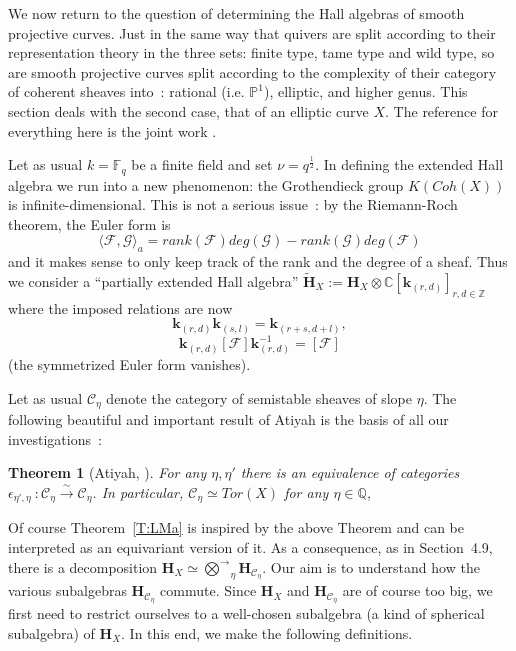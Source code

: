 \documentclass[a4paper,10pt]{amsart}
\def\Z{\mathbb{Z}}
\def\Q{\mathbb{Q}}
\def\H{\mathbf{H}}
\def\C{\mathbb{C}}
\newtheorem{theo}{\bf{Theorem}}[section]
\numberwithin{equation}{section}
\begin{document}
{\vspace{.15in}

We now return to the question of determining the Hall algebras of smooth projective curves. Just in the same way that quivers are split according to their representation theory in the three sets: finite type, tame type and wild type, so are smooth projective curves split according to the complexity of their category of coherent sheaves into~: rational (i.e. $\mathbb{P}^1$), elliptic, and higher genus. This section deals with the second case, that of an elliptic curve $X$. The reference for everything here is the joint work \cite{BS}.

\vspace{.15in}

Let as usual $k=\mathbb{F}_q$ be a finite field and set $\nu=q^{\frac{1}{2}}$. In defining the extended Hall algebra we run into a new phenomenon: the Grothendieck group $K(Coh(X))$ is infinite-dimensional. This is not a serious issue~: by the Riemann-Roch theorem, the Euler form is
$$\langle \mathcal{F},\mathcal{G}\rangle_a=rank(\mathcal{F}) deg(\mathcal{G})-rank(\mathcal{G})deg(\mathcal{F})$$
and it makes sense to only keep track of the rank and the degree of a sheaf.
Thus we consider a ``partially extended Hall algebra'' $\widetilde{\H}_X:=\H_X \otimes
\C[\mathbf{k}_{(r,d)}]_{r,d \in \Z}$ where the imposed relations are now
$$\mathbf{k}_{(r,d)} \mathbf{k}_{(s,l)}=\mathbf{k}_{(r+s,d+l)},$$
$$\mathbf{k}_{(r,d)} [\mathcal{F}] \mathbf{k}^{-1}_{(r,d)}=[\mathcal{F}]$$
(the symmetrized Euler form vanishes).

\vspace{.15in}

Let as usual $\mathcal{C}_{\eta}$ denote the category of semistable sheaves of slope $\eta$. The following beautiful and important result of Atiyah is the basis of all our investigations~:

\vspace{.1in}

\begin{theo}[Atiyah, \cite{A}] For any $\eta,\eta'$ there is an equivalence of categories $\epsilon_{\eta',\eta}~:\mathcal{C}_{\eta} \stackrel{\sim}{\to} \mathcal{C}_{\eta}$. In particular, $\mathcal{C}_{\eta} \simeq Tor(X)$ for any $\eta \in \Q$,
\end{theo}

\vspace{.15in}

Of course Theorem~\ref{T:LMa} is inspired by the above Theorem and can be interpreted as an equivariant  version of it. As a consequence, as in Section~4.9, there is a decomposition $\H_X \simeq \vec{\bigotimes}_{\eta} \H_{\mathcal{C}_{\eta}}$. Our aim is to understand how the various subalgebras $\H_{\mathcal{C}_{\eta}}$ commute. Since $\H_X$ and $\H_{\mathcal{C}_{\eta}}$ are of course too big, we first need to restrict ourselves to a well-chosen subalgebra (a kind of spherical subalgebra) of $\H_X$. In this end, we make the following definitions.

}
\end{document}

